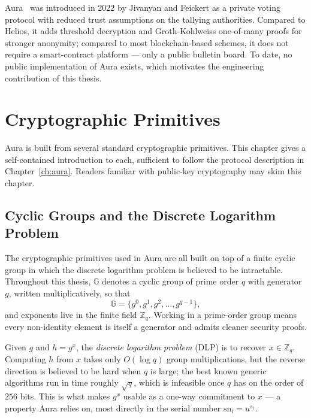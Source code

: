 \documentclass[12pt,a4paper,oneside]{report}
\begin{document}
Aura~\cite{aura2022} was introduced in 2022 by Jivanyan and Feickert as a 
private voting protocol with reduced trust assumptions on the tallying 
authorities. Compared to Helios, it adds threshold decryption and 
Groth-Kohlweiss one-of-many proofs for stronger anonymity; compared to 
most blockchain-based schemes, it does not require a smart-contract 
platform --- only a public bulletin board. To date, no public 
implementation of Aura exists, which motivates the engineering 
contribution of this thesis.

\chapter{Cryptographic Primitives}
\label{ch:primitives}

Aura is built from several standard cryptographic primitives. This chapter 
gives a self-contained introduction to each, sufficient to follow the 
protocol description in Chapter~\ref{ch:aura}. Readers familiar with 
public-key cryptography may skim this chapter.

\section{Cyclic Groups and the Discrete Logarithm Problem}
\label{sec:cyclic-groups}

The cryptographic primitives used in Aura are all built on top of a finite 
cyclic group in which the discrete logarithm problem is believed to be 
intractable. Throughout this thesis, $\mathbb{G}$ denotes a cyclic group 
of prime order $q$ with generator $g$, written multiplicatively, so that
\[
    \mathbb{G} = \{ g^0, g^1, g^2, \ldots, g^{q-1} \},
\]
and exponents live in the finite field $\mathbb{Z}_q$. Working in a 
prime-order group means every non-identity element is itself a generator 
and admits cleaner security proofs.

Given $g$ and $h = g^x$, the \textit{discrete logarithm problem} (DLP) 
is to recover $x \in \mathbb{Z}_q$. Computing $h$ from $x$ takes only 
$O(\log q)$ group multiplications, but the reverse direction is believed 
to be hard when $q$ is large; the best known generic algorithms run in 
time roughly $\sqrt{q}$, which is infeasible once $q$ has on the order of 
$256$ bits. This is what makes $g^x$ usable as a one-way commitment to 
$x$ --- a property Aura relies on, most directly in the serial number 
$\text{sn}_i = u^{s_i}$.
\end{document}
